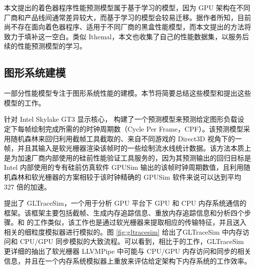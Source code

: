 

本文提出的着色器程序性能预测模型属于基于学习的模型，因为 GPU 架构在不同厂商和产品线间通常差异较大，而基于学习的模型会较易迁移。据作者所知，目前尚不存在面向着色器程序、适用于不同厂商的黑盒性能模型，而本文提出的方法将致力于填补这一空白。类似 Ithemal，本文也收集了自己的性能数据集，以服务后续的性能预测模型的学习。

\subsection{图形系统建模}


一部分性能模型专注于图形系统性能的建模。本节将简要总结这些模型和提出这些模型的工作。

针对 Intel Skylake GT3 显示核心，\citet{10.1145/3126557} 构建了一个预测模型来预测给定图形负载设定下每帧绘制完成所需的的时钟周期数（Cycle Per Frame，CPF）。该预测模型采用随机森林来回归利用截帧工具截取的、来自不同游戏的 Direct3D 视角下的一帧，并且其输入是软光栅器渲染该帧时的一些绘制流水线统计数据。该方法本质上是为加速厂商内部使用的硅前性能验证工具服务的，因为其预测输出的回归目标是 Intel 内部使用的专有硅前仿真软件 GPUSim 输出的该帧时钟周期数值，且利用随机森林和软光栅器的方案相较于该时钟精确的 GPUSim 软件来说可以达到平均 327 倍的加速。

\citet{8167756} 提出了 GLTraceSim，一个用于分析 GPU 平台下 GPU 和 CPU 内存系统通信的框架。该框架主要包括截帧、生成内存追踪信息、重放内存追踪信息和分析四个步骤。和 \citet{10.1145/3126557} 的工作类似，该工作也是通过软光栅器来提取相应的传输特征，并且送入相关的细粒度模拟器进行模拟的。图 \ref{fig:gltracesim} 给出了GLTraceSim 中内存访问和 CPU/GPU 同步模拟的大致流程。可以看到，相比于\citet{10.1145/3126557}的工作，GLTraceSim 更详细的抽出了软光栅器 LLVMPipe 中可能与 CPU/GPU 内存访问和同步的相关信息，并且在一个内存系统模拟器上重放来评估给定架构下内存系统的工作效率。

